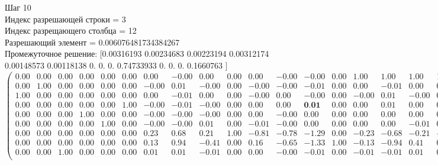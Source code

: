 \documentclass{article}
\begin{document}
\begin{flushleft}
    Шаг 10\\
Индекс разрешающей строки = 3\\
Индекс разрещающего столбца = 12\\
Разрешающий элемент = 0.006076481734384267\\
Промежуточное решение:
 [0.00316193 0.00234683 0.00223194 0.00312174 0.00148573 0.00118138
 0.         0.         0.         0.74733933 0.         0.
 0.         0.1660763 ]
\begin{equation*}
\begin{pmatrix}
 0.00 & 0.00 & 0.00 & 0.00 & 0.00 & 0.00 &  0.00 & -0.00 &  0.00 & 0.00 &  0.00 & -0.00 & -0.00 & 0.00 &  1.00 &  1.00 &  1.00 &  1.00 &  1.00 &  1.00 &  1.00 &  1.00 & -0.00 \\
 0.00 & 1.00 & 0.00 & 0.00 & 0.00 & 0.00 & -0.00 &  0.01 & -0.00 & 0.00 & -0.00 & -0.00 & -0.01 & 0.00 &  0.00 & -0.01 &  0.00 &  0.00 &  0.00 &  0.00 &  0.01 &  0.00 &  0.00 \\
 1.00 & 0.00 & 0.00 & 0.00 & 0.00 & 0.00 &  0.00 & -0.01 &  0.00 & 0.00 & -0.00 &  0.00 & -0.00 & 0.00 & -0.00 &  0.01 & -0.00 &  0.00 &  0.00 & -0.00 &  0.00 &  0.00 &  0.00 \\
 0.00 & 0.00 & 0.00 & 0.00 & 0.00 & 1.00 & -0.00 & -0.01 & -0.00 & 0.00 &  0.00 &  0.00 &  \textbf{0.01} & 0.00 &  0.00 &  0.01 &  0.00 &  0.00 & -0.00 & -0.00 & -0.01 &  0.00 &  0.00 \\
 0.00 & 0.00 & 0.00 & 1.00 & 0.00 & 0.00 & -0.00 & -0.00 & -0.00 & 0.00 &  0.00 & -0.00 &  0.00 & 0.00 &  0.00 &  0.00 &  0.00 &  0.00 & -0.00 &  0.00 & -0.00 &  0.00 &  0.00 \\
 0.00 & 0.00 & 0.00 & 0.00 & 1.00 & 0.00 & -0.00 & -0.00 &  0.01 & 0.00 & -0.01 & -0.00 &  0.00 & 0.00 &  0.00 &  0.00 & -0.01 &  0.00 &  0.01 &  0.00 & -0.00 &  0.00 &  0.00 \\
 0.00 & 0.00 & 0.00 & 0.00 & 0.00 & 0.00 &  0.23 &  0.68 &  0.21 & 1.00 & -0.81 & -0.78 & -1.29 & 0.00 & -0.23 & -0.68 & -0.21 & -1.00 &  0.81 &  0.78 &  1.29 &  0.00 &  0.75 \\
 0.00 & 0.00 & 0.00 & 0.00 & 0.00 & 0.00 &  0.13 &  0.94 & -0.41 & 0.00 &  0.16 & -0.65 & -1.33 & 1.00 & -0.13 & -0.94 &  0.41 &  0.00 & -0.16 &  0.65 &  1.33 & -1.00 &  0.17 \\
 0.00 & 0.00 & 1.00 & 0.00 & 0.00 & 0.00 &  0.01 &  0.01 & -0.01 & 0.00 &  0.00 & -0.00 & -0.01 & 0.00 & -0.01 & -0.01 &  0.01 &  0.00 & -0.00 &  0.00 &  0.01 &  0.00 &  0.00 \\
\end{pmatrix}
\end{equation*}
\end{flushleft}
\end{document}
